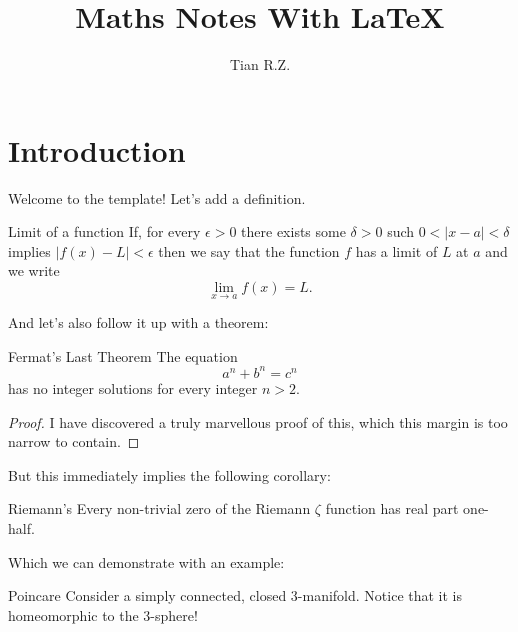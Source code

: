 \documentclass{MathNote}
\title{Maths Notes With \LaTeX}
\author{Tian R.Z.}
\begin{document}
	\maketitle
	\section{Introduction}
	Welcome to the template! Let's add a definition.
	\begin{definition}{Limit of a function}{}
	If, for every $ \epsilon >0 $ there exists some $ \delta >0 $ such $ 0<|x-a|<\delta $ implies $ |f(x)-L|<\epsilon $ then we say that the function $ f $ has a limit of $ L $ at $ a $ and we write
	\[\lim_{x\to a}f(x)=L.\]
	\end{definition}
	And let's also follow it up with a theorem:
	\begin{theorem}{Fermat's Last Theorem}{}
		The equation
		\[a^n+b^n=c^n\]
		has no integer solutions for every integer $ n> 2 $.
	\end{theorem}
	\begin{proof}
		I have discovered a truly marvellous proof of this, which this margin is too narrow to contain.
        
	\end{proof}
	But this immediately implies the following corollary:
	\begin{corollary}{Riemann's}{}
		Every non-trivial zero of the Riemann $ \zeta $ function has real part one-half.
	\end{corollary}
	Which we can demonstrate with an example:
	\begin{example}{Poincare}{}
		Consider a simply connected, closed 3-manifold. Notice that it is homeomorphic to the 3-sphere!
	\end{example}
		
\end{document}
